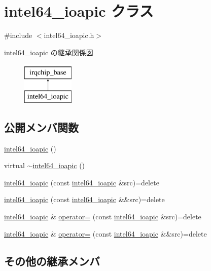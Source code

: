 \hypertarget{classintel64__ioapic}{}\section{intel64\+\_\+ioapic クラス}
\label{classintel64__ioapic}


{\ttfamily \#include $<$intel64\+\_\+ioapic.\+h$>$}

intel64\+\_\+ioapic の継承関係図\begin{figure}[H]
\begin{center}
\leavevmode
\includegraphics[height=2.000000cm]{classintel64__ioapic}
\end{center}
\end{figure}
\subsection*{公開メンバ関数}
\begin{DoxyCompactItemize}
\item 
\hyperlink{classintel64__ioapic_a3306f184d7c81a1e2a8762cb7aac9e6d}{intel64\+\_\+ioapic} ()
\item 
virtual \hyperlink{classintel64__ioapic_a08463ca362fd28f4db43173fd08754df}{$\sim$intel64\+\_\+ioapic} ()
\item 
\hyperlink{classintel64__ioapic_a2922ee7f84429f41538e711363c1d01b}{intel64\+\_\+ioapic} (const \hyperlink{classintel64__ioapic}{intel64\+\_\+ioapic} \&src)=delete
\item 
\hyperlink{classintel64__ioapic_a69d45f8e24865e3460f55876a09018f1}{intel64\+\_\+ioapic} (const \hyperlink{classintel64__ioapic}{intel64\+\_\+ioapic} \&\&src)=delete
\item 
\hyperlink{classintel64__ioapic}{intel64\+\_\+ioapic} \& \hyperlink{classintel64__ioapic_a503e60731936974a4260a78a5a6766a1}{operator=} (const \hyperlink{classintel64__ioapic}{intel64\+\_\+ioapic} \&src)=delete
\item 
\hyperlink{classintel64__ioapic}{intel64\+\_\+ioapic} \& \hyperlink{classintel64__ioapic_a3e11addf56fa011cefc5aa504b18585c}{operator=} (const \hyperlink{classintel64__ioapic}{intel64\+\_\+ioapic} \&\&src)=delete
\end{DoxyCompactItemize}
\subsection*{その他の継承メンバ}


